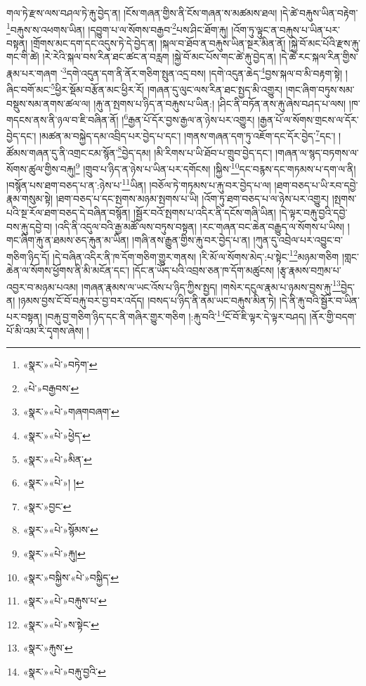 གལ་ཏེ་རྫས་ལས་བཤལ་ཏེ་རྐུ་བྱེད་ན། །ངོས་གཞན་གྱིས་ནི་ངོས་གཞན་ས་མཚམས་ཐལ། །དེ་ཚེ་བརྐུས་ཡིན་བརྟེག་\footnote{«སྣར་»«པེ་»བཏེག་}བརྐུས་ས་འཕགས་ཡིན། །དབྱུག་པ་ལ་སོགས་བརྒྱབ་\footnote{«པེ་»བརྒྱབས་}པས་ཤིང་ཐོག་རྐུ། །འོག་ཏུ་ལྟུང་ན་བརྐུས་པ་ཡིན་པར་བསྟན། །གྲོགས་མང་དག་དང་འདུས་ཏེ་དེ་བྱེད་ན། །སྐལ་བ་ཐོབ་ན་བརྐུས་ཡིན་སྔར་མིན་ནོ། །སྐྱེ་བོ་མང་པོའི་རྫས་རྐུ་གང་གི་ཚེ། །རེ་རེའི་སྐལ་བས་རིན་ཐང་ཚང་ན་བརླག །སྐྱེ་བོ་མང་པོས་གང་ཚེ་རྐུ་བྱེད་ན། །དེ་ཚེ་རང་སྐལ་རིན་གྱིས་རྣམ་པར་གཞག ་\footnote{«སྣར་»«པེ་»གཞགབཞག་}དགེ་འདུན་དག་ནི་ནོར་གཅིག་སྤུན་འདྲ་བས། །དགེ་འདུན་ཆེད་\footnote{«སྣར་»«པེ་»ཕྱེད་}བྱས་སྐལ་བ་མི་བརྟག་སྟེ། །ཞིང་བགོ་མང་\footnote{«སྣར་»«པེ་»མིན་}ཕྱིར་སྡོམ་བརྩོན་མང་ཕྱིར་རོ། །གཞན་དུ་ལུང་ལས་རིན་ཐང་སྤྱད་མི་འགྱུར། །གང་ཞིག་བཏུས་སམ་བསྡུས་སམ་ནགས་ཚལ་ལ། །རྐུ་ན་སྤགས་པ་ཉིད་ན་བརྐུས་པ་ཡིན:། །ཤིང་ནི་བཏོན་ནས་རྐུ་ཞེས་བཤད་པ་ལས། །ཁ་གདངས་ནས་ནི་ཉལ་བ་ཇི་བཞིན་ནོ། །\footnote{«སྣར་»«པེ་»། །}རྒྱན་པོ་དོར་བྱས་རྒྱལ་ན་ཉེས་པར་འགྱུར། །རྒྱན་པོ་ལ་སོགས་གྲངས་ལ་དོར་བྱེད་དང་། །མཚན་མ་བསྐྱེད་དམ་འབྲིད་པར་བྱེད་པ་དང་། །གནས་གཞན་དག་ཏུ་འཇོག་དང་དོར་བྱེད་\footnote{«སྣར་»བྱང་}དང་། །ཚོམས་གཞན་དུ་ནི་འགྲང་ངམ་སྙོན་\footnote{«སྣར་»«པེ་»སྙོམས་}བྱེད་དམ། །མི་རིགས་པ་ཡི་ཐོབ་པ་གྲུབ་བྱེད་དང་། །གཞན་ལ་སྙད་བཏགས་ལ་སོགས་ཚུལ་གྱིས་བརྐུ།\footnote{«སྣར་»«པེ་»རྐུ།} །གྲུབ་པ་ཉིད་ན་ཉེས་པ་ཡིན་པར་དགོངས། །སྐྱིས་\footnote{«སྣར་»བསྐྱིས་«པེ་»བསྐྱིད་}དང་བརྙས་དང་གཏམས་པ་དག་ལ་ནི། །བསྙོན་པས་ཐག་བཅད་པ་ན་:ཉེས་པ་\footnote{«སྣར་»«པེ་»བརྐུས་པ་}ཡིན། །བཅོལ་ཏེ་གཏམས་པ་རྐུ་བར་བྱེད་པ་ལ། །ཐག་བཅད་པ་ཡི་རབ་དབྱེ་རྣམ་གསུམ་སྟེ། །ཐག་བཅད་པ་དང་སྤགས་མཉམ་སྤགས་པ་ཡི། །འོག་ཏུ་ཐག་བཅད་པ་ལ་ཉེས་པར་འགྱུར། །སྤགས་པའི་སྔ་རོལ་ཐག་བཅད་དེ་བཞིན་བསྙོན། །སྦྱོར་བའོ་སྤགས་པ་འདིར་ནི་དངོས་གཞི་ཡིན། །དེ་ལྟར་བརྐུ་བྱའི་དབྱེ་བས་རྐུ་དབྱེ་བ། །འདི་ནི་འདུལ་བའི་རྒྱ་མཚོ་ལས་བཏུས་བསྟན། །རང་གཞན་བང་ཆེན་བརྒྱུད་ལ་སོགས་པ་ཡིས། །གང་ཞིག་རྐུ་ན་ཐམས་ཅད་རྐུན་མ་ཡིན། །གཞི་ནས་རྒྱུན་གྱིས་རྐུ་བར་བྱེད་པ་ན། །ཀུན་དུ་འབྲེལ་པར་འབྱུང་བ་གཅིག་ཉིད་དོ། །དེ་བཞིན་འདིར་ནི་ཁ་དོག་གཅིག་གྱུར་གནས། །རི་མོ་ལ་སོགས་མེད་:པ་སྟེང་\footnote{«སྣར་»«པེ་»ས་སྟེང་}མཉམ་གཅིག །གླང་ཆེན་ལ་སོགས་ཕྱོགས་ནི་མི་མངོན་དང་། །དོང་ན་ཡོད་པའི་འབྲས་ཅན་ཁ་དོག་མཚུངས། །རྩྭ་རྣམས་བཀྲམ་པ་འབྱར་བ་མཉམ་པའམ། །གཞན་རྣམས་ལ་ཡང་འོས་པ་ཉིད་ཀྱིས་སྤྱད། །གསེར་དངུལ་རྣམ་པ་ཉམས་བྱས་རྐུ་\footnote{«སྣར་»རྐུས་}བྱེད་ན། །ཉམས་བྱས་ངོ་བོ་བརྐུ་བར་བྱ་བར་འདོད། །བསད་པ་ཉིད་ནི་ནམ་ཡང་བརྐུས་མིན་ཏེ། །དེ་ནི་རྐུ་བའི་སྦྱོར་བ་ཡིན་པར་བསྟན། །བརྐུ་བྱ་གཅིག་ཉིད་དང་ནི་གཞིར་གྱུར་གཅིག །:རྐུ་བའི་\footnote{«སྣར་»«པེ་»བརྐུ་བྱའི་}ངོ་བོ་ཇི་ལྟར་དེ་ལྟར་བཤད། །ནོར་གྱི་བདག་པོ་མི་འམ་རི་དྭགས་ཞེས། །
